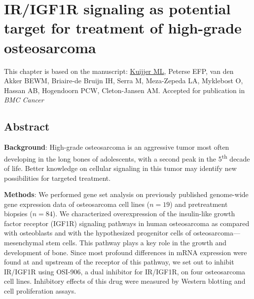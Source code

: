 

%


\chapter{IR/IGF1R signaling as potential target for treatment of high-grade osteosarcoma}\label{ch5}
\thispagestyle{empty}				%

\vfill

\vspace{0.5cm}
This chapter is based on the manuscript:
\underline{Kuijjer ML}, Peterse EFP, van den Akker BEWM, Briaire-de Bruijn IH, Serra M, Meza-Zepeda LA, Myklebost O, Hassan AB, Hogendoorn PCW, Cleton-Jansen AM. Accepted for publication in {\it BMC Cancer}

\newpage


\section{Abstract}\label{abstract5}
\textbf{Background}: High-grade osteosarcoma is an aggressive tumor most often developing in the long bones of adolescents, with a second peak in the 5\textsuperscript{th} decade of life. Better knowledge on cellular signaling in this tumor may identify new possibilities for targeted treatment.

\textbf{Methods}: We performed gene set analysis on previously published genome\hyp{}wide gene expression data of osteosarcoma cell lines ($n=19$) and pretreatment biopsies ($n=84$). We characterized overexpression of the insulin\hyp{}like growth factor receptor (IGF1R) signaling pathways in human osteosarcoma as compared with osteoblasts and with the hypothesized progenitor cells of osteosarcoma---mesenchymal stem cells. This pathway plays a key role in the growth and development of bone. Since most profound differences in mRNA expression were found at and upstream of the receptor of this pathway, we set out to inhibit IR/IGF1R using OSI-906, a dual inhibitor for IR/IGF1R, on four osteosarcoma cell lines. Inhibitory effects of this drug were measured by Western blotting and cell proliferation assays.

